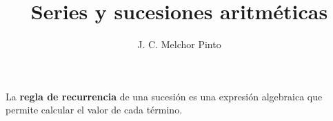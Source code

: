 \documentclass[12pt]{guia}
\title{Series y sucesiones aritméticas}
\author{J. C. Melchor Pinto}
\begin{document}
\pagestyle{headandfoot}
\addpoints
\INFO
\printanswers
\begin{questions}
    
    
    \newpage
    \begin{importantbox}
        La \textbf{regla de recurrencia} de una sucesión es una expresión algebraica que permite calcular el valor de cada término.
    \end{importantbox}
    
    \newpage
    
    \newpage
    \begin{multicols}{2}
        
        
    \end{multicols}
    
    \begin{multicols}{2}
        
        
    \end{multicols}
    
    
    
    
\end{questions}
\end{document}
